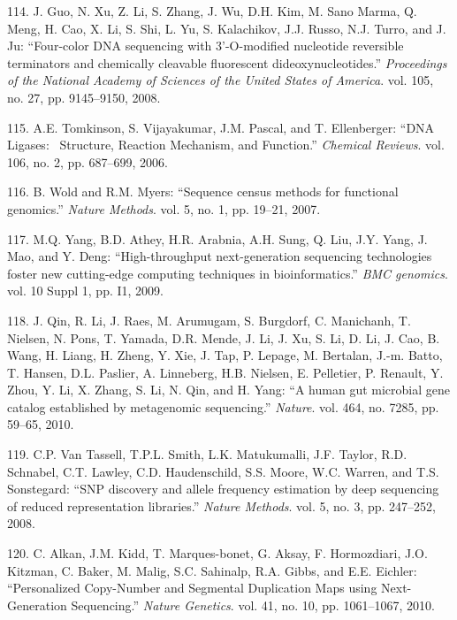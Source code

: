 \documentclass[12pt,a4paper,twoside]{ugathesis}
\theoremstyle{definition}
\theoremstyle{definition}
\theoremstyle{definition}
\theoremstyle{remark}
\begin{document}
\hypertarget{ref-Guo2008}{}
114. J. Guo, N. Xu, Z. Li, S. Zhang, J. Wu, D.H. Kim, M. Sano Marma, Q.
Meng, H. Cao, X. Li, S. Shi, L. Yu, S. Kalachikov, J.J. Russo, N.J.
Turro, and J. Ju: ``Four-color DNA sequencing with 3'-O-modified
nucleotide reversible terminators and chemically cleavable fluorescent
dideoxynucleotides.'' \emph{Proceedings of the National Academy of
Sciences of the United States of America}. vol. 105, no. 27, pp.
9145--9150, 2008.

\hypertarget{ref-Tomkinson2006}{}
115. A.E. Tomkinson, S. Vijayakumar, J.M. Pascal, and T. Ellenberger:
``DNA Ligases:~ Structure, Reaction Mechanism, and Function.''
\emph{Chemical Reviews}. vol. 106, no. 2, pp. 687--699, 2006.

\hypertarget{ref-Wold2007}{}
116. B. Wold and R.M. Myers: ``Sequence census methods for functional
genomics.'' \emph{Nature Methods}. vol. 5, no. 1, pp. 19--21, 2007.

\hypertarget{ref-Yang2009}{}
117. M.Q. Yang, B.D. Athey, H.R. Arabnia, A.H. Sung, Q. Liu, J.Y. Yang,
J. Mao, and Y. Deng: ``High-throughput next-generation sequencing
technologies foster new cutting-edge computing techniques in
bioinformatics.'' \emph{BMC genomics}. vol. 10 Suppl 1, pp. I1, 2009.

\hypertarget{ref-Qin2010}{}
118. J. Qin, R. Li, J. Raes, M. Arumugam, S. Burgdorf, C. Manichanh, T.
Nielsen, N. Pons, T. Yamada, D.R. Mende, J. Li, J. Xu, S. Li, D. Li, J.
Cao, B. Wang, H. Liang, H. Zheng, Y. Xie, J. Tap, P. Lepage, M.
Bertalan, J.-m. Batto, T. Hansen, D.L. Paslier, A. Linneberg, H.B.
Nielsen, E. Pelletier, P. Renault, Y. Zhou, Y. Li, X. Zhang, S. Li, N.
Qin, and H. Yang: ``A human gut microbial gene catalog established by
metagenomic sequencing.'' \emph{Nature}. vol. 464, no. 7285, pp. 59--65,
2010.

\hypertarget{ref-VanTassell2008}{}
119. C.P. Van Tassell, T.P.L. Smith, L.K. Matukumalli, J.F. Taylor, R.D.
Schnabel, C.T. Lawley, C.D. Haudenschild, S.S. Moore, W.C. Warren, and
T.S. Sonstegard: ``SNP discovery and allele frequency estimation by deep
sequencing of reduced representation libraries.'' \emph{Nature Methods}.
vol. 5, no. 3, pp. 247--252, 2008.

\hypertarget{ref-Alkan2010}{}
120. C. Alkan, J.M. Kidd, T. Marques-bonet, G. Aksay, F. Hormozdiari,
J.O. Kitzman, C. Baker, M. Malig, S.C. Sahinalp, R.A. Gibbs, and E.E.
Eichler: ``Personalized Copy-Number and Segmental Duplication Maps using
Next-Generation Sequencing.'' \emph{Nature Genetics}. vol. 41, no. 10,
pp. 1061--1067, 2010.
\end{document}
